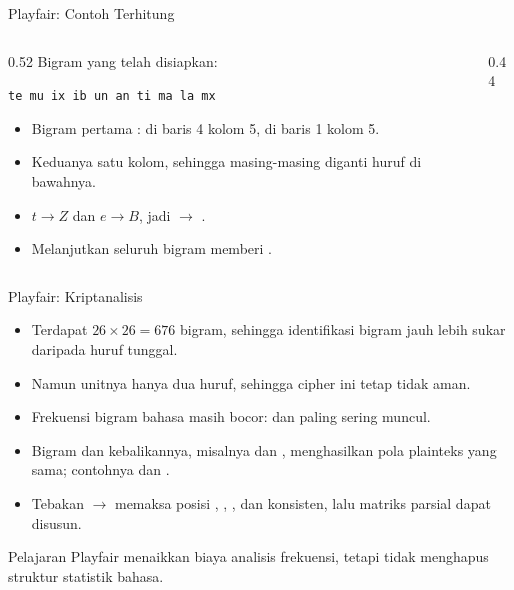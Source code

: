 \documentclass[aspectratio=169,11pt]{beamer}
\begin{document}
\begin{frame}{Playfair: Contoh Terhitung}
    \begin{columns}[T,onlytextwidth]
        \begin{column}{0.52\textwidth}
            \footnotesize
            Bigram yang telah disiapkan:
            \begin{center}
            \scriptsize\texttt{te mu ix ib un an ti ma la mx}
            \end{center}
            \begin{itemize}
                \item Bigram pertama :  di baris 4 kolom 5,
                       di baris 1 kolom 5.
                \item Keduanya satu kolom, sehingga masing-masing diganti
                      huruf di bawahnya.
                \item $t\rightarrow Z$ dan $e\rightarrow B$, jadi
                       $\rightarrow$ .
                \item Melanjutkan seluruh bigram memberi
                      .
            \end{itemize}
        \end{column}
        \begin{column}{0.44\textwidth}
            \centering
        \end{column}
    \end{columns}
\end{frame}

\begin{frame}{Playfair: Kriptanalisis}
    \footnotesize
    \begin{itemize}
        \item Terdapat $26\times26=676$ bigram, sehingga identifikasi bigram
              jauh lebih sukar daripada huruf tunggal.
        \item Namun unitnya hanya dua huruf, sehingga cipher ini tetap tidak
              aman.
        \item Frekuensi bigram bahasa masih bocor:  dan 
              paling sering muncul.
        \item Bigram dan kebalikannya, misalnya  dan ,
              menghasilkan pola plainteks yang sama; contohnya  dan
              .
        \item Tebakan  $\rightarrow$  memaksa posisi
              , , , dan  konsisten, lalu
              matriks parsial dapat disusun.
    \end{itemize}
    \vspace{0.15cm}
    \begin{exampleblock}{Pelajaran}
        \footnotesize
        Playfair menaikkan biaya analisis frekuensi, tetapi tidak menghapus
        struktur statistik bahasa.
    \end{exampleblock}
\end{frame}
\end{document}
